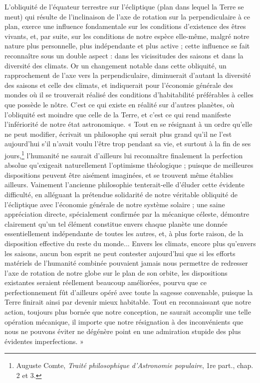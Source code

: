 \documentclass[a4paper, 11pt, oneside]{article}
\begin{document}
L'obliquité de l'équateur terrestre sur l'écliptique (plan dans lequel la Terre se meut) qui résulte de l'inclinaison de l'axe de rotation sur la perpendiculaire à ce plan, exerce une influence fondamentale sur les conditions d'existence des êtres vivants, et, par suite, sur les conditions de notre espèce elle-même, malgré notre nature plus personnelle, plus indépendante et plus active ; cette influence se fait reconnaître sous un double aspect : dans les vicissitudes des saisons et dans la diversité des climats. Or un changement notable dans cette obliquité, un rapprochement de l'axe vers la perpendiculaire, diminuerait d'autant la diversité des saisons et celle des climats, et indiquerait pour l'économie générale des mondes où il se trouverait réalisé des conditions d'habitabilité préférables à celles que possède le nôtre. C'est ce qui existe en réalité sur d'autres planètes, où l'obliquité est moindre que celle de la Terre, et c'est ce qui rend manifeste l'infériorité de notre état astronomique. « Tout en se résignant à un ordre qu'elle ne peut modifier, écrivait un philosophe qui serait plus grand qu'il ne l'est aujourd'hui s'il n'avait voulu l'être trop pendant sa vie, et surtout à la fin de ses jours,\footnote{Auguste Comte, \emph{Traité philosophique d'Astronomie populaire}, 1re part., chap. 2 et 3.} l'humanité ne saurait d'ailleurs lui reconnaître finalement la perfection absolue qu'exigeait naturellement l'optimisme théologique ; puisque de meilleures dispositions peuvent être aisément imaginées, et se trouvent même établies ailleurs. Vainement l'ancienne philosophie tenterait-elle d'éluder cette évidente difficulté, en alléguant la prétendue solidarité de notre véritable obliquité de l'écliptique avec l'économie générale de notre système solaire ; une saine appréciation directe, spécialement confirmée par la mécanique céleste, démontre clairement qu'un tel élément constitue envers chaque planète une donnée essentiellement indépendante de toutes les autres, et, à plus forte raison, de la disposition effective du reste du monde... Envers les climats, encore plus qu'envers les saisons, aucun bon esprit ne peut contester aujourd'hui que si les efforts matériels de l'humanité combinée pouvaient jamais nous permettre de redresser l'axe de rotation de notre globe sur le plan de son orbite, les dispositions existantes seraient réellement beaucoup améliorées, pourvu que ce perfectionnement fût d'ailleurs opéré avec toute la sagesse convenable, puisque la Terre finirait ainsi par devenir mieux habitable. Tout en reconnaissant que notre action, toujours plus bornée que notre conception, ne saurait accomplir une telle opération mécanique, il importe que notre résignation à des inconvénients que nous ne pouvons éviter ne dégénère point en une admiration stupide des plus évidentes imperfections. »
\end{document}
